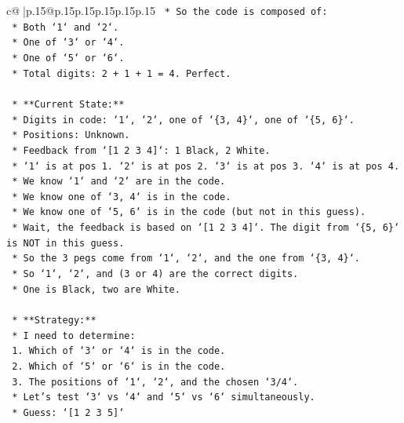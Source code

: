 \documentclass{article}
\begin{document}
{\begin{supertabular}{c@{$\;$}|p{.15\linewidth}@{}p{.15\linewidth}p{.15\linewidth}p{.15\linewidth}p{.15\linewidth}p{.15\linewidth}}
{{{\texttt{        *   So the code is composed of:} \\
\texttt{            *   Both `1` and `2`.} \\
\texttt{            *   One of `3` or `4`.} \\
\texttt{            *   One of `5` or `6`.} \\
\texttt{        *   Total digits: 2 + 1 + 1 = 4. Perfect.} \\
\\ 
\texttt{    *   **Current State:**} \\
\texttt{        *   Digits in code: `1`, `2`, one of `\{3, 4\}`, one of `\{5, 6\}`.} \\
\texttt{        *   Positions: Unknown.} \\
\texttt{        *   Feedback from `{[}1 2 3 4{]}`: 1 Black, 2 White.} \\
\texttt{            *   `1` is at pos 1. `2` is at pos 2. `3` is at pos 3. `4` is at pos 4.} \\
\texttt{            *   We know `1` and `2` are in the code.} \\
\texttt{            *   We know one of `3, 4` is in the code.} \\
\texttt{            *   We know one of `5, 6` is in the code (but not in this guess).} \\
\texttt{            *   Wait, the feedback is based on `{[}1 2 3 4{]}`. The digit from `\{5, 6\}` is NOT in this guess.} \\
\texttt{            *   So the 3 pegs come from `1`, `2`, and the one from `\{3, 4\}`.} \\
\texttt{            *   So `1`, `2`, and (3 or 4) are the correct digits.} \\
\texttt{            *   One is Black, two are White.} \\
\\ 
\texttt{    *   **Strategy:**} \\
\texttt{        *   I need to determine:} \\
\texttt{            1.  Which of `3` or `4` is in the code.} \\
\texttt{            2.  Which of `5` or `6` is in the code.} \\
\texttt{            3.  The positions of `1`, `2`, and the chosen `3/4`.} \\
\texttt{        *   Let's test `3` vs `4` and `5` vs `6` simultaneously.} \\
\texttt{        *   Guess: `{[}1 2 3 5{]}`} \\
}}}
\end{supertabular}}
\end{document}
